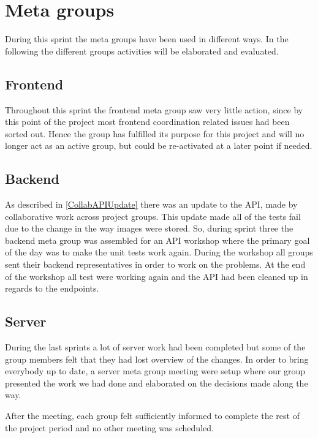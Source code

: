 \section{Meta groups}
During this sprint the meta groups have been used in different ways.
In the following the different groups activities will be elaborated and evaluated.

\subsection{Frontend}
Throughout this sprint the frontend meta group saw very little action, since by this point of the project most frontend coordination related issues had been sorted out.
Hence the group has fulfilled its purpose for this project and will no longer act as an active group, but could be re-activated at a later point if needed.

\subsection{Backend}
As described in \autoref{CollabAPIUpdate} there was an update to the API, made by collaborative work across project groups.
This update made all of the tests fail due to the change in the way images were stored.
So, during sprint three the backend meta group was assembled for an API workshop where the primary goal of the day was to make the unit tests work again.
During the workshop all groups sent their backend representatives in order to work on the problems.
At the end of the workshop all test were working again and the API had been cleaned up in regards to the endpoints.

\subsection{Server}
During the last sprints a lot of server work had been completed but some of the group members felt that they had lost overview of the changes.
In order to bring everybody up to date, a server meta group meeting were setup where our group presented the work we had done and elaborated on the decisions made along the way.

After the meeting, each group felt sufficiently informed to complete the rest of the project period and no other meeting was scheduled.

